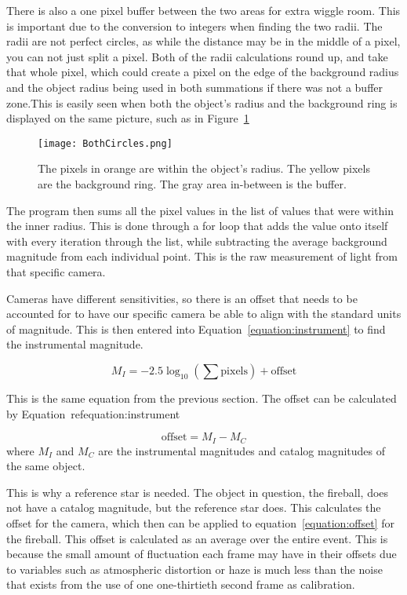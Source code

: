 There is also a one pixel buffer between the two areas for extra wiggle room. This is important due to the conversion to integers when finding the two radii. The radii are not perfect circles, as while the distance may be in the middle of a pixel, you can not just split a pixel. Both of the radii calculations round up, and take that whole pixel, which could create a pixel on the edge of the background radius and the object radius being used in both summations if there was not a buffer zone.This is easily seen when both the object's radius and the background ring is displayed on the same picture, such as in Figure~\ref{fig:BothCircles} 

\begin{figure}[ht!]
	\centering
	\texttt{[image: BothCircles.png]}
	\caption{The pixels in orange are within the object's radius. The yellow pixels are the background ring. The gray area in-between is the buffer.}
	\label{fig:BothCircles}
\end{figure}

The program then sums all the pixel values in the list of values that were within the inner radius. This is done through a for loop that adds the value onto itself with every iteration through the list, while subtracting the average background magnitude from each individual point. This is the raw measurement of light from that specific camera.

Cameras have different sensitivities, so there is an offset that needs to be accounted for to have our specific camera be able to align with the standard units of magnitude.   This is then entered into Equation~\ref{equation:instrument} to find the instrumental magnitude. 

\begin{equation}
	M_I = -2.5 \log_{10}\left( \sum \text{pixels}\right) + \text{offset}
	\label{equation:instrument}
\end{equation}

This is the same equation from the previous section. The offset can be calculated by Equation~ref{equation:instrument}

\begin{equation}
	\text{offset} = M_I - M_C
	\label{equation:offset}
\end{equation}
where $M_I$ and $M_C$ are the instrumental magnitudes and catalog magnitudes of the same object.

This is why a reference star is needed. The object in question, the fireball, does not have a catalog magnitude, but the reference star does. This calculates the offset for the camera, which then can be applied to equation~\ref{equation:offset} for the fireball. This offset is calculated as an average over the entire event. This is because the small amount of fluctuation each frame may have in their offsets due to variables such as atmospheric distortion or haze is much less than the noise that exists from the use of one one-thirtieth second frame as calibration.

